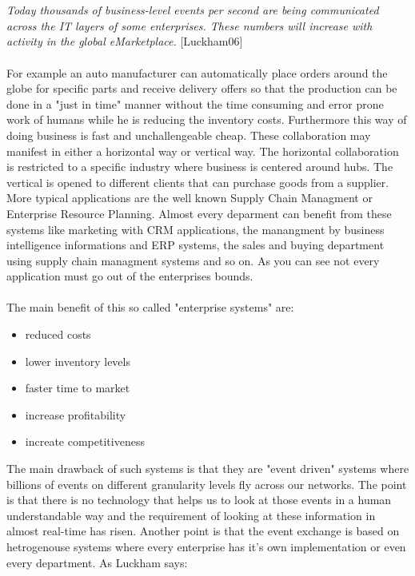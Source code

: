 \documentclass[a4paper,titlepage,11pt,DIV10,BCOR0.5cm,headinclude]{article}
\begin{document}
\\\\
\textit{Today thousands of business-level events per second are being communicated across the IT layers of some enterprises. These numbers will increase with activity in the global eMarketplace.} [Luckham06]
\\\\
For example an auto manufacturer can automatically place orders around the globe for specific parts and receive delivery offers so that the production can be done in a "just in time" manner without the time consuming and error prone work of humans while he is reducing the inventory costs. Furthermore this way of doing business is fast and unchallengeable cheap. These collaboration may manifest in either a horizontal way or vertical way. The horizontal collaboration is restricted to a specific industry where business is centered around hubs. The vertical is opened to different clients that can purchase goods from a supplier. More typical applications are the well known Supply Chain Managment or Enterprise Resource Planning. Almost every deparment can benefit from these systems like marketing with CRM applications, the manangment by business intelligence informations and ERP systems, the sales and buying department using supply chain managment systems and so on. As you can see not every application must go out of the enterprises bounds.
\\\\
The main benefit of this so called "enterprise systems" are:
\begin{itemize}
	\item reduced costs
	\item lower inventory levels
	\item faster time to market
	\item increase profitability
	\item increate competitiveness
\end{itemize}
The main drawback of such systems is that they are "event driven" systems where billions of events on different granularity levels fly across our networks. The point is that there is no technology that helps us to look at those events in a human understandable way and the requirement of looking at these information in almost real-time has risen. Another point is that the event exchange is based on hetrogenouse systems where every enterprise has it's own implementation or even every department. As Luckham says:
\\\\
\end{document}
